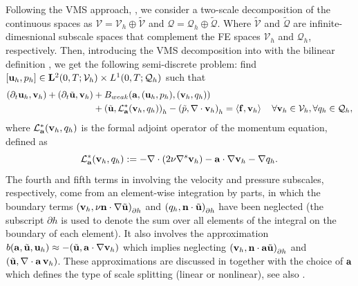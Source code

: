 Following the VMS approach, \cite{hughes_variational_1998}, we consider a two-scale decomposition of the continuous spaces as $ \mathcal{V}=\mathcal{V}_h\oplus\widetilde{\mathcal{V}} $ and $ \mathcal{Q}=\mathcal{Q}_h\oplus\widetilde{\mathcal{Q}} $. Where $ \widetilde{\mathcal{V}} $ and $\widetilde{\mathcal{Q}} $ are infinite-dimesnional subscale spaces that complement the FE spaces $ \mathcal{V}_h $ and $ \mathcal{Q}_h $, respectively. Then, introducing the VMS decomposition into  with the bilinear definition , we get the following semi-discrete problem: find 
$[{\bf u}_h,p_h]\in\mathbf{L}^2(0,T;\mathcal{V}_{h})\times L^1(0,T;\mathcal{Q}_{h})$ such that
\begin{align}
\label{eq-C7_NS_vms_weak}
(\partial_t{\bf u}_h,{\bf v}_h)+(\partial_t\tilde{{\bf u}},{\bf v}_h)&+B_{weak}({\bf a},({\bf u}_h,p_h),({\bf v}_h,q_h))\\\nonumber
&+\left(\tilde{{\bf u}},\mathcal{L}^*_{\bf a}({\bf v}_h,q_h)\right)_h-\left(\tilde{p},\nabla\cdot{\bf v}_h\right)_h =\left<{\bf f},{\bf v}_h\right>
\quad\forall{\bf v}_h\in\mathcal{V}_{h},\forall q_h\in\mathcal{Q}_{h},
\end{align}
where $ \mathcal{L}^*_{\bf a}({\bf v}_h,q_h) $ is the formal adjoint operator of the momentum equation, defined as 
\begin{equation}
\label{eq-C7_NS_adjoint}
\mathcal{L}^*_{\bf a}({\bf v}_h,q_h):=-\nabla\cdot\left(2\nu\nabla^s{\bf v}_h\right)-{\bf a}\cdot\nabla{\bf v}_h-\nabla q_h.
\end{equation}
The fourth and fifth terms in  involving the velocity and pressure subscales, respectively, come from an element-wise integration by parts, in which the boundary terms 
$\left( {\bf v}_{h},\nu {\bf n}\cdot \nabla \tilde{{\bf u}}\right)_{\partial h}$ and
$\left( q_{h},{\bf n}\cdot \tilde{{\bf u}}\right)_{\partial h}$
have been neglected (the subscript ${\partial h}$ is used to denote the sum over all elements of the integral on the boundary of each element). It also involves the approximation 
$b({\bf a},\tilde{{\bf u}},{\bf u}_h) \approx -(\tilde{{\bf u}},{\bf a}\cdot\nabla{\bf v}_h)$
which implies neglecting 
$\left( {\bf v}_{h},{\bf n}\cdot {\bf a} \tilde{{\bf u}}\right)_{\partial h}$ and
$(\tilde{{\bf u}},\nabla\cdot{\bf a} \, {\bf v}_h)$. 
These approximations are discussed in  \cite{codina_time_2007} together with the choice of ${\bf a}$ which defines the type of scale splitting (linear or nonlinear), see also \cite{colomes_assessment_2015}.

